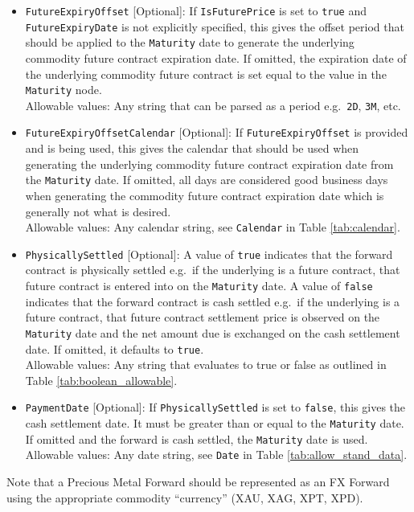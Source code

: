 \begin{itemize}
\item \lstinline!FutureExpiryOffset! [Optional]: If \lstinline!IsFuturePrice! is set to \lstinline!true! and \lstinline!FutureExpiryDate! is not explicitly specified, this gives the offset period that should be applied to the \lstinline!Maturity! date to generate the underlying commodity future contract expiration date. If omitted, the expiration date of the underlying commodity future contract is set equal to the value in the \lstinline!Maturity! node. \\
Allowable values: Any string that can be parsed as a period e.g.\ \lstinline!2D!, \lstinline!3M!, etc.

\item \lstinline!FutureExpiryOffsetCalendar! [Optional]: If \lstinline!FutureExpiryOffset! is provided and is being used, this gives the calendar that should be used when generating the underlying commodity future contract expiration date from the \lstinline!Maturity! date. If omitted, all days are considered good business days when generating the commodity future contract expiration date which is generally not what is desired. \\
Allowable values: Any calendar string, see \lstinline!Calendar! in Table \ref{tab:calendar}.

\item \lstinline!PhysicallySettled! [Optional]: A value of \lstinline!true! indicates that the forward contract is physically settled e.g.\ if the underlying is a future contract, that future contract is entered into on the \lstinline!Maturity! date. A value of \lstinline!false! indicates that the forward contract is cash settled e.g.\ if the underlying is a future contract, that future contract settlement price is observed on the \lstinline!Maturity! date and the net amount due is exchanged on the cash settlement date. If omitted, it defaults to \lstinline!true!. \\
Allowable values: Any string that evaluates to true or false as outlined in Table \ref{tab:boolean_allowable}.

\item \lstinline!PaymentDate! [Optional]: If \lstinline!PhysicallySettled! is set to \lstinline!false!, this gives the cash settlement date. It must be greater than or equal to the \lstinline!Maturity! date. If omitted and the forward is cash settled, the \lstinline!Maturity! date is used. \\
Allowable values: Any date string, see \lstinline!Date! in Table \ref{tab:allow_stand_data}.

\end{itemize}

Note that a Precious Metal Forward should be represented as an FX Forward using the appropriate commodity ``currency'' (XAU, XAG, XPT, XPD).
